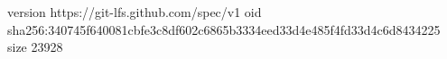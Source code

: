 version https://git-lfs.github.com/spec/v1
oid sha256:340745f640081cbfe3c8df602c6865b3334eed33d4e485f4fd33d4c6d8434225
size 23928
